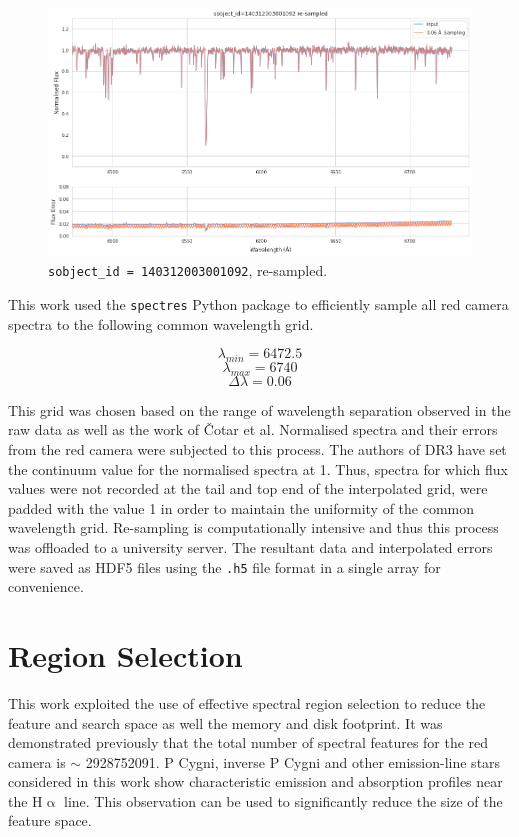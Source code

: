 \begin{figure}[!htb]
\centering
\includegraphics[scale=.40]{figures/resampling example.png}
\caption{\texttt{sobject\_id = 140312003001092}, re-sampled.}
\end{figure}

This work used the \texttt{spectres} Python package \citep{carnall2017spectres} to efficiently sample all red camera spectra to the following common wavelength grid.

\[\lambda_{min} = 6472.5\]
\[\lambda_{max} = 6740\]
\[\Delta\lambda = 0.06\]

This grid was chosen based on the range of wavelength separation observed in the raw data as well as the work of Čotar et al. Normalised spectra and their errors from the red camera were subjected to this process. The authors of DR3 have set the continuum value for the normalised spectra at 1. Thus, spectra for which flux values were not recorded at the tail and top end of the interpolated grid, were padded with the value 1 in order to maintain the uniformity of the common wavelength grid. Re-sampling is computationally intensive and thus this process was offloaded to a university server. The resultant data and interpolated errors were saved as HDF5 files using the \texttt{.h5} file format in a single array for convenience. 

\section{Region Selection}

This work exploited the use of effective spectral region selection to reduce the feature and search space as well the memory and disk footprint. It was demonstrated previously that the total number of spectral features for the red camera is $\sim$ \num[round-precision=2,round-mode=figures, scientific-notation=true]{2928752091}. P Cygni, inverse P Cygni and other emission-line stars considered in this work show characteristic emission and absorption profiles near the H$\upalpha$ line. This observation can be used to significantly reduce the size of the feature space. 

